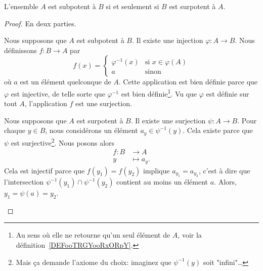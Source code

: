 \begin{proposition}      \label{PROPooWSXTooMQPcNG}
    L'ensemble \( A\) est subpotent à \( B\) si et seulement si \( B\) est surpotent à \( A\).
\end{proposition}

\begin{proof}
    En deux parties.
    \begin{subproof}
        \item[Premier sens]
            Nous supposons que \( A\) est subpotent à \( B\). Il existe une injection \( \varphi\colon A\to B\). Nous définissons \( f\colon B\to A\) par
            \begin{equation}
                f(x)=\begin{cases}
                    \varphi^{-1}(x)    &   \text{si } x\in\varphi(A)\\
                    a    &    \text{sinon } 
                \end{cases}
            \end{equation}
            où \( a\) est un élément quelconque de \( A\). Cette application est bien définie parce que \( \varphi\) est injective, de telle sorte que \( \varphi^{-1}\) est bien définie\footnote{Au sens où elle ne retourne qu'un seul élément de \(A\), voir la définition~\ref{DEFooTRGYooRxORpY}.}. Vu que \( \varphi\) est définie sur tout \( A\), l'application \( f\) est une surjection.
        \item[L'autre sens]
            Nous supposons que \( A\) est surpotent à \( B\). Il existe une surjection \( \psi\colon A\to B\). Pour chaque \( y\in B\), nous considérons un élément \( a_y\in \psi^{-1}(y)\). Cela existe parce que \( \psi\) est surjective\footnote{Mais ça demande l'axiome du choix: imaginez que \(\psi^{-1}(y)\) soit "infini"\dots}. Nous posons alors
            \begin{equation}
                \begin{aligned}
                    f\colon B&\to A \\
                    y&\mapsto a_y. 
                \end{aligned}
            \end{equation}
            Cela est injectif parce que \( f(y_1)=f(y_2)\) implique \( a_{y_1}=a_{y_2}\), c'est à dire que l'intersection \( \psi^{-1}(y_1)\cap\psi^{-1}(y_2)\) contient au moins un élément \(a\). Alors, \( y_1 = \psi(a) = y_2\).
    \end{subproof}
\end{proof}


